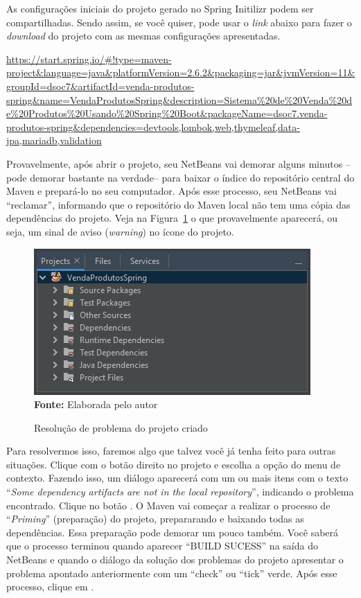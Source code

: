 As configurações iniciais do projeto gerado no Spring Initilizr podem ser compartilhadas. Sendo assim, se você quiser, pode usar o \textit{link} abaixo para fazer o \textit{download} do projeto com as mesmas configurações apresentadas.

\url{https://start.spring.io/#!type=maven-project&language=java&platformVersion=2.6.2&packaging=jar&jvmVersion=11&groupId=dsoc7&artifactId=venda-produtos-spring&name=VendaProdutosSpring&description=Sistema%20de%20Venda%20de%20Produtos%20Usando%20Spring%20Boot&packageName=dsoc7.venda-produtos-spring&dependencies=devtools,lombok,web,thymeleaf,data-jpa,mariadb,validation}

Provavelmente, após abrir o projeto, seu NetBeans vai demorar alguns minutos --pode demorar bastante na verdade-- para baixar o índice do repositório central do Maven e prepará-lo no seu computador. Após esse processo, seu NetBeans vai ``reclamar'', informando que o repositório do Maven local não tem uma cópia das dependências do projeto. Veja na Figura~\ref{fig:cap10ConfProjeto03} o que provavelmente aparecerá, ou seja, um sinal de aviso (\textit{warning}) no ícone do projeto.

\FloatBarrier
\begin{figure}[!htbp]
    \centering
    \caption{Resolução de problema do projeto criado}
    \includegraphics[scale=1]{imagens/cap10ConfProjeto03}
    \\\textbf{Fonte:} Elaborada pelo autor
    \label{fig:cap10ConfProjeto03}
\end{figure}
\FloatBarrier

Para resolvermos isso, faremos algo que talvez você já tenha feito para outras situações. Clique com o botão direito no projeto e escolha a opção  do menu de contexto. Fazendo isso, um diálogo aparecerá com um ou mais itens com o texto ``\textit{Some dependency artifacts are not in the local repository}'', indicando o problema encontrado. Clique no botão . O Maven vai começar a realizar o processo de ``\textit{Priming}'' (preparação) do projeto, prepararando e baixando todas as dependências. Essa preparação pode demorar um pouco também. Você saberá que o processo terminou quando aparecer ``BUILD SUCESS'' na saída do NetBeans e quando o diálogo da solução dos problemas do projeto apresentar o problema apontado anteriormente com um ``check'' ou ``tick'' verde. Após esse processo, clique em .

